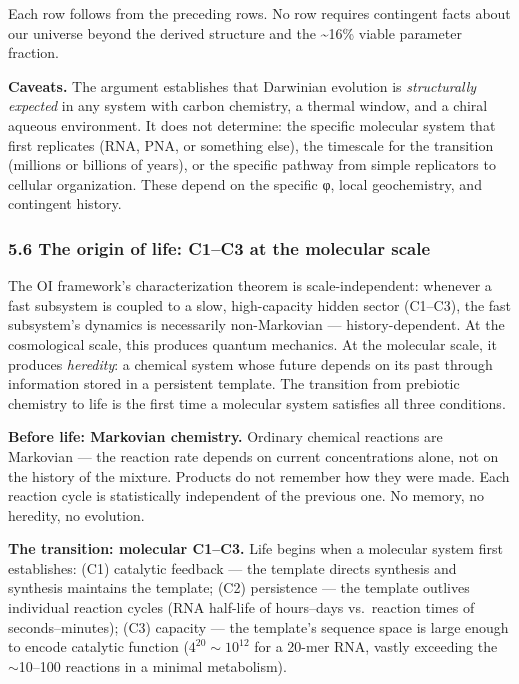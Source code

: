 \documentclass[
]{article}
\begin{document}
Each row follows from the preceding rows. No row requires contingent
facts about our universe beyond the derived structure and the
\textasciitilde16\% viable parameter fraction.

\textbf{Caveats.} The argument establishes that Darwinian evolution is
\emph{structurally expected} in any system with carbon chemistry, a
thermal window, and a chiral aqueous environment. It does not determine:
the specific molecular system that first replicates (RNA, PNA, or
something else), the timescale for the transition (millions or billions
of years), or the specific pathway from simple replicators to cellular
organization. These depend on the specific φ, local geochemistry, and
contingent history.

\hypertarget{the-origin-of-life-c1c3-at-the-molecular-scale}{%
\subsubsection{5.6 The origin of life: C1--C3 at the molecular
scale}\label{the-origin-of-life-c1c3-at-the-molecular-scale}}

The OI framework's characterization theorem is scale-independent:
whenever a fast subsystem is coupled to a slow, high-capacity hidden
sector (C1--C3), the fast subsystem's dynamics is necessarily
non-Markovian --- history-dependent. At the cosmological scale, this
produces quantum mechanics. At the molecular scale, it produces
\emph{heredity}: a chemical system whose future depends on its past
through information stored in a persistent template. The transition from
prebiotic chemistry to life is the first time a molecular system
satisfies all three conditions.

\textbf{Before life: Markovian chemistry.} Ordinary chemical reactions
are Markovian --- the reaction rate depends on current concentrations
alone, not on the history of the mixture. Products do not remember how
they were made. Each reaction cycle is statistically independent of the
previous one. No memory, no heredity, no evolution.

\textbf{The transition: molecular C1--C3.} Life begins when a molecular
system first establishes: (C1) catalytic feedback --- the template
directs synthesis and synthesis maintains the template; (C2) persistence
--- the template outlives individual reaction cycles (RNA half-life of
hours--days vs.~reaction times of seconds--minutes); (C3) capacity ---
the template's sequence space is large enough to encode catalytic
function (\(4^{20} \sim 10^{12}\) for a 20-mer RNA, vastly exceeding the
$\sim$10--100 reactions in a minimal metabolism).
\end{document}
